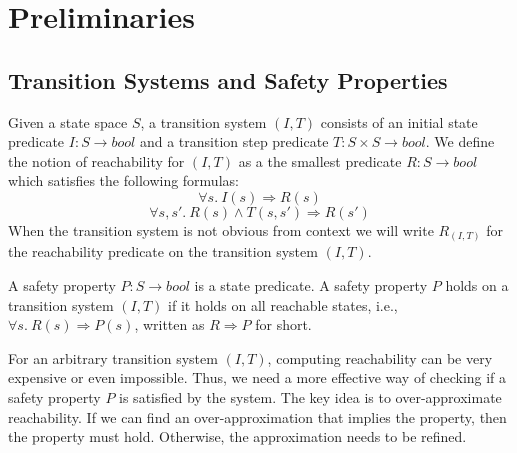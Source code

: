 \section{Preliminaries}
\label{sec:background}

\newcommand{\bool}[0]{\mathit{bool}}
\newcommand{\reach}[0]{\mathit{R}}
\newcommand{\ite}[3]{\mathit{if}\ #1\ \mathit{then}\ #2\ \mathit{else}\ #3}

\subsection{Transition Systems and Safety Properties}

Given a state space $S$, a transition system $(I,T)$ consists of an
initial state predicate $I : S \to \bool$ and a transition step
predicate $T : S \times S \to \bool$. We define the notion of
reachability for $(I, T)$ as a the smallest predicate $\reach : S \to
\bool$ which satisfies the following formulas:
\begin{equation*}
  \forall s.~ I(s) \Rightarrow \reach(s)
\end{equation*}
\begin{equation*}
  \forall s, s'.~ \reach(s) \land T(s, s') \Rightarrow \reach(s')
\end{equation*}
When the transition system is not obvious from context we will write
$\reach_{(I,T)}$ for the reachability predicate on the transition
system $(I,T)$.

A safety property $P : S \to \bool$ is a state predicate. A safety
property $P$ holds on a transition system $(I, T)$ if it holds on all
reachable states, i.e., $\forall s.~ \reach(s) \Rightarrow P(s)$,
written as $\reach \Rightarrow P$ for short.

For an arbitrary transition system $(I, T)$, computing reachability
can be very expensive or even impossible. Thus, we need a more
effective way of checking if a safety property $P$ is satisfied by the
system. The key idea is to over-approximate reachability. If we can
find an over-approximation that implies the property, then the
property must hold. Otherwise, the approximation needs to be refined.

